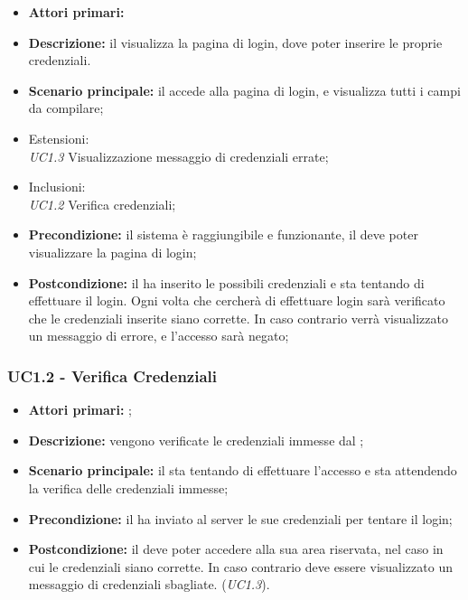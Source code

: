 \documentclass[../analisi-dei-requisiti]{subfiles}
\begin{document}
\begin{itemize}
\item \textbf{Attori primari:} 
\item \textbf{Descrizione:} il  visualizza la pagina di login, dove poter inserire le proprie credenziali. 
\item \textbf{Scenario principale:} il  accede alla pagina di login, e visualizza tutti i campi da compilare;
\item Estensioni: \\\emph{UC1.3} Visualizzazione messaggio di credenziali errate;
\item Inclusioni: \\\emph{UC1.2} Verifica credenziali;
\item \textbf{Precondizione:} il sistema è raggiungibile e funzionante, il  deve poter visualizzare la pagina di login;
\item \textbf{Postcondizione:} il  ha inserito le possibili credenziali e sta tentando di effettuare il login. Ogni volta che cercherà di effettuare
login sarà verificato che le credenziali inserite siano corrette. In caso contrario verrà visualizzato un messaggio di errore, e l'accesso sarà negato;

\end{itemize}

\subsubsection{UC1.2 - Verifica Credenziali}
\label{subsub:UC1.2}

\begin{itemize}
\item \textbf{Attori primari:} ;
\item \textbf{Descrizione:} vengono verificate le credenziali immesse dal ;
\item \textbf{Scenario principale:} il  sta tentando di effettuare l'accesso e sta attendendo la verifica delle credenziali immesse;
\item \textbf{Precondizione:} il  ha inviato al server le sue credenziali per tentare il login;
\item \textbf{Postcondizione:} il  deve poter accedere alla sua area riservata, nel caso in cui le credenziali siano corrette. In caso
contrario deve essere visualizzato un messaggio di credenziali sbagliate. (\emph{UC1.3}).

\end{itemize}
\end{document}
